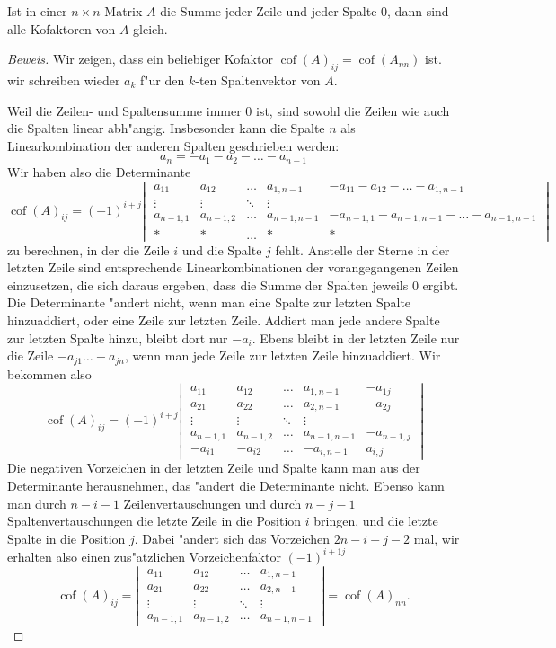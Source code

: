 \begin{hilfssatz}
Ist in einer $n\times n$-Matrix $A$ die Summe jeder Zeile und jeder
Spalte $0$, dann sind alle Kofaktoren von $A$ gleich.
\end{hilfssatz}
\begin{proof}[Beweis]
Wir zeigen, dass ein beliebiger Kofaktor
$\operatorname{cof}(A)_{ij}=\operatorname{cof}(A_{nn})$ ist.
wir schreiben wieder $a_k$ f"ur den $k$-ten Spaltenvektor von $A$.

Weil die Zeilen- und Spaltensumme immer $0$ ist, sind sowohl die
Zeilen wie auch die Spalten linear abh"angig. Insbesonder kann die Spalte
$n$ als Linearkombination der anderen Spalten geschrieben werden:
\[
a_n=-a_1-a_2-\dots-a_{n-1}
\]
Wir haben also die Determinante
\[
\operatorname{cof}(A)_{ij}
=
(-1)^{i+j}
\left|\;
\begin{matrix}
a_{11}&a_{12}&\dots &a_{1,n-1}&-a_{11}-a_{12}-\dots-a_{1,n-1}\\
\vdots&\vdots&\ddots&\vdots\\
a_{n-1,1}&a_{n-1,2}&\dots&a_{n-1,n-1}&-a_{n-1,1}-a_{n-1,n-1}-\dots-a_{n-1,n-1}\\
*&*&\dots&*&*
\end{matrix}
\;\right|
\]
zu berechnen, in der die Zeile $i$ und die Spalte $j$ fehlt. Anstelle
der Sterne in der letzten Zeile sind entsprechende Linearkombinationen
der vorangegangenen Zeilen einzusetzen, die sich daraus ergeben,
dass die Summe der Spalten jeweils $0$ ergibt.
Die Determinante "andert nicht, wenn man eine Spalte zur letzten Spalte
hinzuaddiert, oder eine Zeile zur letzten Zeile. Addiert man jede
andere Spalte zur letzten Spalte hinzu, bleibt dort nur $-a_i$.
Ebens bleibt in der letzten Zeile nur die Zeile $-a_{j1}\dots-a_{jn}$,
wenn man jede Zeile zur letzten Zeile hinzuaddiert. Wir bekommen also
\[
\operatorname{cof}(A)_{ij}
=
(-1)^{i+j}
\left|\;
\begin{matrix}
a_{11}&a_{12}&\dots &a_{1,n-1}&-a_{1j}\\
a_{21}&a_{22}&\dots &a_{2,n-1}&-a_{2j}\\
\vdots&\vdots&\ddots&\vdots\\
a_{n-1,1}&a_{n-1,2}&\dots&a_{n-1,n-1}&-a_{n-1,j}\\
-a_{i1}&-a_{i2}&\dots&-a_{i,n-1}&a_{i,j}
\end{matrix}
\;\right|
\]
Die negativen Vorzeichen in der letzten Zeile und Spalte kann man aus
der Determinante herausnehmen, das "andert die Determinante nicht.
Ebenso kann man durch $n-i-1$ Zeilenvertauschungen und durch
$n-j-1$ Spaltenvertauschungen die letzte Zeile in die
Position $i$ bringen, und die letzte Spalte in die Position $j$.
Dabei "andert sich das Vorzeichen $2n-i-j-2$ mal, wir erhalten also
einen zus"atzlichen Vorzeichenfaktor $(-1)^{i+1j}$
\[
\operatorname{cof}(A)_{ij}=
\left|\;
\begin{matrix}
a_{11}&a_{12}&\dots&a_{1,n-1}\\
a_{21}&a_{22}&\dots&a_{2,n-1}\\
\vdots&\vdots&\ddots&\vdots\\
a_{n-1,1}&a_{n-1,2}&\dots&a_{n-1,n-1}
\end{matrix}
\;\right|
=\operatorname{cof}(A)_{nn}.
\]
\end{proof}
